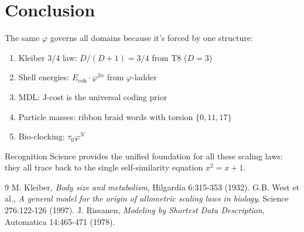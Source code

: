 \documentclass[12pt,a4paper]{article}
\theoremstyle{definition}
\theoremstyle{remark}
\begin{document}
\section{Conclusion}

The same $\varphi$ governs all domains because it's forced by one structure:
\begin{enumerate}
\item Kleiber $3/4$ law: $D/(D+1) = 3/4$ from T8 ($D = 3$)
\item Shell energies: $E_\mathrm{coh} \cdot \varphi^{2n}$ from $\varphi$-ladder
\item MDL: J-cost is the universal coding prior
\item Particle masses: ribbon braid words with torsion $\{0,11,17\}$
\item Bio-clocking: $\tau_0 \varphi^N$
\end{enumerate}

Recognition Science provides the unified foundation for all these scaling laws: 
they all trace back to the single self-similarity equation $x^2 = x + 1$.

\begin{thebibliography}{9}
 M. Kleiber, \emph{Body size and metabolism}, Hilgardia 6:315-353 (1932).
 G.B. West et al., \emph{A general model for the origin of allometric scaling 
laws in biology}, Science 276:122-126 (1997).
 J. Rissanen, \emph{Modeling by Shortest Data Description}, 
Automatica 14:465-471 (1978).
\end{thebibliography}
\end{document}
